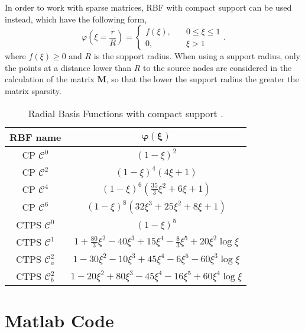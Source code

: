 \documentclass[12pt,a4paper]{article}
\theoremstyle{plain}
\theoremstyle{definition}
\begin{document}
In order to work with sparse matrices, RBF with compact support can be used instead, which have the following form,
%
\begin{equation}
\varphi \left( \xi = \frac{r}{R} \right) = \left\{
\begin{array}{ll}
f \left( \xi \right), \quad & 0 \leq \xi \leq 1 \\
0, \quad & \xi > 1
\end{array}.
\right.
\end{equation}
%
where $f \left( \xi \right) \geq 0$ and $R$ is the support radius. When using a support radius, only the points at a distance lower than $R$ to the source nodes are considered in the calculation of the matrix $\mathbf{M}$, so that the lower the support radius the greater the matrix sparsity.

\begin{table}[H]
\centering
\begin{tabular}{|c|c|}
\hline 
\textbf{RBF name} & $\mathbf{ \varphi \left( \xi \right) }$ \\ 
\hline 
CP $\mathcal{C}^0$ & $\left( 1 - \xi \right)^2$ \\ 
\hline 
CP $\mathcal{C}^2$ & $\left( 1 - \xi \right)^4 \left( 4 \xi + 1 \right)$ \\ 
\hline 
CP $\mathcal{C}^4$ & $\left( 1 - \xi \right)^6 \left( \frac{35}{3} \xi^2 + 6 \xi + 1  \right)$ \\ 
\hline 
CP $\mathcal{C}^6$ & $\left( 1 - \xi \right)^8 \left( 32 \xi^3 + 25 \xi^2 + 8 \xi + 1  \right)$ \\ 
\hline 
CTPS $\mathcal{C}^0$ & $\left( 1 - \xi \right)^5$ \\ 
\hline 
CTPS $\mathcal{C}^1$ & $1 + \frac{80}{3} \xi^2 - 40 \xi^3 + 15 \xi^4 - \frac{8}{3} \xi^5 + 20 \xi^2 \log \xi$ \\ 
\hline 
CTPS $\mathcal{C}^2_a$ & $1 - 30 \xi^2 - 10 \xi^3 + 45 \xi^4 - 6 \xi^5 - 60 \xi^3 \log \xi$ \\
\hline 
CTPS $\mathcal{C}^2_b$ & $1 - 20 \xi^2 + 80 \xi^3 - 45 \xi^4 - 16 \xi^5 + 60 \xi^4 \log \xi$ \\
\hline 
\end{tabular}
\caption{Radial Basis Functions with compact support \cite{wendland1996}.}  \label{tab:RBFglobalsupport}
\end{table}

\section*{Matlab Code}
\end{document}
